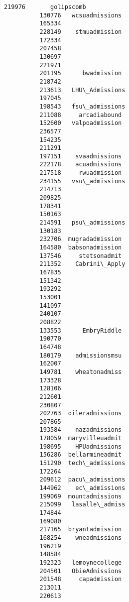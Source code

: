 \documentclass[11pt]{article}
\begin{document}
\begin{Verbatim}[commandchars=\\\{\}]
          219976       golipscomb  
          130776   wcsuadmissions  
          165334                   
          228149    stmuadmission  
          172334                   
          207458                   
          130697                   
          221971                   
          201195      bwadmission  
          218742                   
          213613   LHU\_Admissions  
          197045                   
          198543   fsu\_admissions  
          211088     arcadiabound  
          152600   valpoadmission  
          236577                   
          154235                   
          211291                   
          197151    svaadmissions  
          222178    acuadmissions  
          217518     rwuadmission  
          234155   vsu\_admissions  
          214713                   
          209825                   
          178341                   
          150163                   
          214591   psu\_admissions  
          130183                   
          232706  mugradadmission  
          164580  babsonadmission  
          137546     stetsonadmit  
          211352    Cabrini\_Apply  
          167835                   
          151342                   
          193292                   
          153001                   
          141097                   
          240107                   
          208822                   
          133553      EmbryRiddle  
          190770                   
          164748                   
          180179    admissionsmsu  
          162007                   
          149781    wheatonadmiss  
          173328                   
          128106                   
          212601                   
          230807                   
          202763  oileradmissions  
          207865                   
          193584    nazadmissions  
          178059  maryvilleuadmit  
          198695    HPUadmissions  
          156286  bellarmineadmit  
          151290  tech\_admissions  
          172264                   
          209612  pacu\_admissions  
          144962    ec\_admissions  
          199069  mountadmissions  
          215099   lasalle\_admiss  
          174844                   
          169080                   
          217165  bryantadmission  
          168254    wneadmissions  
          196219                   
          148584                   
          192323   lemoynecollege  
          204501   ObieAdmissions  
          201548     capadmission  
          213011                   
          220613                   

\end{Verbatim}
\end{document}
